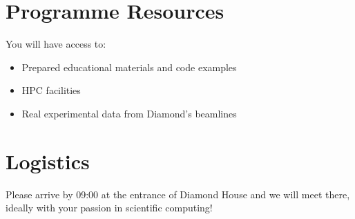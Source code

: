 \documentclass[11pt, a4paper]{article}
\begin{document}
\section*{Programme Resources}

You will have access to:
\begin{itemize}
    \item Prepared educational materials and code examples
    \item HPC facilities
    \item Real experimental data from Diamond's beamlines
\end{itemize}

\section*{Logistics}

Please arrive by 09:00 at the entrance of Diamond House and we will meet there, ideally with your passion in scientific computing!
\end{document}
